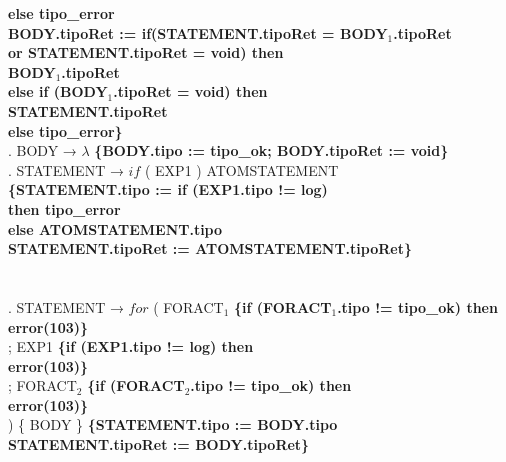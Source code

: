 \begin{tabbing}
    \>                    \>           \>\textbf{else tipo\_error}\\
    \>                    \>\textbf{BODY.tipoRet := if(STATEMENT.tipoRet = BODY$_1$.tipoRet}\\
    \>                    \>           \>\textbf{or STATEMENT.tipoRet = void) then}\\
    \>                    \>           \>          \>\textbf{BODY$_1$.tipoRet}\\
    \>                    \>           \>\textbf{else if (BODY$_1$.tipoRet = void) then}\\
    \>                    \>           \>          \>\textbf{STATEMENT.tipoRet}\\
    \>                    \>           \>\textbf{else tipo\_error\}}\\
    . BODY → $\lambda$ \textbf{\{BODY.tipo := tipo\_ok; BODY.tipoRet := void\}}\\
    . STATEMENT → $if$ ( EXP1 ) ATOMSTATEMENT\\
    \>                    \> \textbf{\{STATEMENT.tipo := if (EXP1.tipo != log)}\\
    \>                    \> \> \>\textbf{then tipo\_error}\\
    \>                    \> \> \textbf{else ATOMSTATEMENT.tipo}\\
    \>                    \> \textbf{STATEMENT.tipoRet := ATOMSTATEMENT.tipoRet\}}\\
    \\
    \\
    . STATEMENT → $for$ ( FORACT$_1$ \textbf{\{if (FORACT$_1$.tipo != tipo\_ok) then }\\
    \>                    \>                \>      \>\textbf{error(103)\}}\\
    \>                    \> ; EXP1 \textbf{\{if (EXP1.tipo != log) then }\\
    \>                    \>                \>      \>\textbf{error(103)\}}\\
    \>                    \> ; FORACT$_2$ \textbf{\{if (FORACT$_2$.tipo != tipo\_ok) then }\\
    \>                    \>                \>      \>\textbf{error(103)\}}\\
    \>                    \> ) \{ BODY \} \textbf{\{STATEMENT.tipo := BODY.tipo}\\
    \>                    \> \>\textbf{STATEMENT.tipoRet := BODY.tipoRet\}}\\


\end{tabbing}
